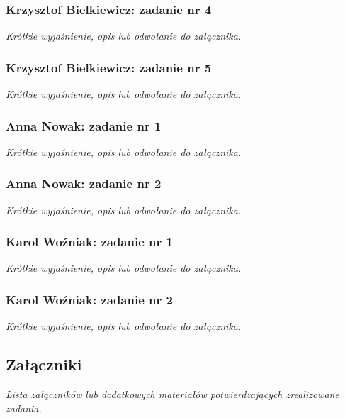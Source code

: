 \documentclass[12pt,a4paper,oneside]{article}
\theoremstyle{definition}
\numberwithin{equation}{section}
\begin{document}
\subsubsection{Krzysztof Bielkiewicz: zadanie nr 4}
\label{1.3.4}
\textit{Krótkie wyjaśnienie, opis lub odwołanie do załącznika.}

\subsubsection{Krzysztof Bielkiewicz: zadanie nr 5}
\label{1.3.5}
\textit{Krótkie wyjaśnienie, opis lub odwołanie do załącznika.}


\subsubsection{Anna Nowak: zadanie nr 1}
\textit{Krótkie wyjaśnienie, opis lub odwołanie do załącznika.}
\subsubsection{Anna Nowak: zadanie nr 2}
\textit{Krótkie wyjaśnienie, opis lub odwołanie do załącznika.}


\subsubsection{Karol Woźniak: zadanie nr 1}
\textit{Krótkie wyjaśnienie, opis lub odwołanie do załącznika.}
\subsubsection{Karol Woźniak: zadanie nr 2}
\textit{Krótkie wyjaśnienie, opis lub odwołanie do załącznika.}

\subsection{Załączniki}
\textit{Lista załączników lub dodatkowych materiałów potwierdzających zrealizowane zadania.}



\renewcommand\refname{Literatura (jeżeli wymagana)}

%
%
%
\end{document}
